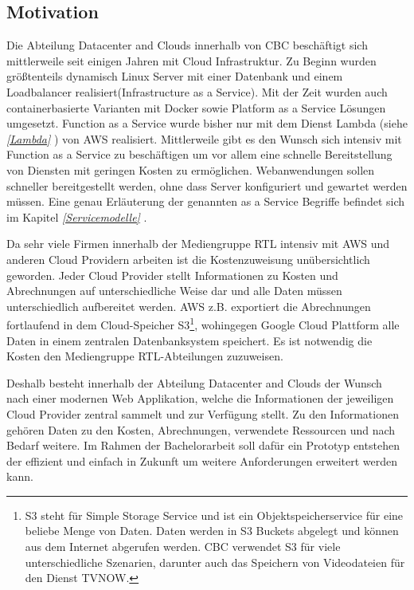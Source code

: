 \subsection{Motivation}
\label{Motivation}
Die Abteilung Datacenter and Clouds innerhalb von CBC beschäftigt sich mittlerweile seit einigen Jahren mit Cloud Infrastruktur.
Zu Beginn wurden größtenteils dynamisch Linux Server mit einer Datenbank und einem Loadbalancer realisiert(Infrastructure as a Service).
Mit der Zeit wurden auch containerbasierte Varianten mit Docker sowie Platform as a Service Lösungen umgesetzt.
Function as a Service wurde bisher nur mit dem Dienst Lambda (siehe \textit{\ref{Lambda} }) von AWS realisiert.
Mittlerweile gibt es den Wunsch sich intensiv mit Function as a Service zu beschäftigen um vor allem eine schnelle Bereitstellung von Diensten mit geringen Kosten zu ermöglichen.
Webanwendungen sollen schneller bereitgestellt werden, ohne dass Server konfiguriert und gewartet werden müssen.
Eine genau Erläuterung der genannten \glqq [...] as a Service\grqq{} Begriffe befindet sich im Kapitel \textit{\ref{Servicemodelle} }.

Da sehr viele Firmen innerhalb der Mediengruppe RTL intensiv mit AWS und anderen Cloud Providern arbeiten ist die Kostenzuweisung unübersichtlich geworden.
Jeder Cloud Provider stellt Informationen zu Kosten und Abrechnungen auf unterschiedliche Weise dar und alle Daten müssen unterschiedlich aufbereitet werden.
AWS z.B. exportiert die Abrechnungen fortlaufend in dem Cloud-Speicher
S3\footnote{S3 steht für Simple Storage Service und ist ein Objektspeicherservice für eine beliebe Menge von Daten.
Daten werden in S3 Buckets abgelegt und können aus dem Internet abgerufen werden.
CBC verwendet S3 für viele unterschiedliche Szenarien, darunter auch das Speichern von Videodateien für den Dienst TVNOW.   }, wohingegen Google Cloud Plattform alle Daten in einem zentralen Datenbanksystem speichert.
Es ist notwendig die Kosten den Mediengruppe RTL-Abteilungen zuzuweisen.

Deshalb besteht innerhalb der Abteilung Datacenter and Clouds der Wunsch nach einer modernen Web Applikation, welche die Informationen der jeweiligen Cloud Provider zentral sammelt und zur Verfügung stellt.
Zu den Informationen gehören Daten zu den Kosten, Abrechnungen, verwendete Ressourcen und nach Bedarf weitere.
Im Rahmen der Bachelorarbeit soll dafür ein Prototyp entstehen der effizient und einfach in Zukunft um weitere Anforderungen erweitert werden kann.
